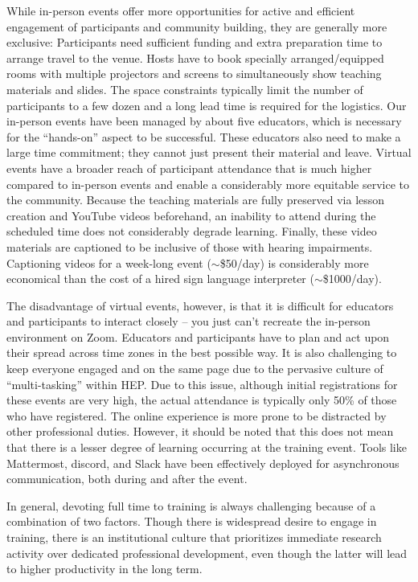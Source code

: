 \documentclass[twocolumn]{svjour3}          %
\begin{document}
While in-person events offer more opportunities for active and efficient engagement of participants and community building, they are generally more exclusive: Participants need sufficient funding and extra preparation time to arrange travel to the venue. Hosts have to book specially arranged/equipped rooms with multiple projectors and screens to simultaneously show teaching materials and slides. The space constraints typically limit the number of participants to a few dozen and a long lead time is required for the logistics.
Our in-person events have been managed by about five educators, which is necessary for the \enquote{hands-on} aspect to be successful. These educators also need to make a large time commitment; they cannot just present their material and leave.
Virtual events have a broader reach of participant attendance that is much higher compared to in-person events and enable a considerably more equitable service to the community. Because the teaching materials are fully preserved via lesson creation and YouTube videos beforehand, an inability to attend during the scheduled time does not considerably degrade learning.  Finally, these video materials are captioned to be inclusive of those with hearing impairments. Captioning videos for a week-long event ($\sim$\$50/day) is considerably more economical than the cost of a hired sign language interpreter ($\sim$\$1000/day).

The disadvantage of virtual events, however, is that it is difficult for educators and participants to interact closely -- you just can’t recreate the in-person environment on Zoom. Educators and participants have to plan and act upon their spread across time zones in the best possible way. It is also challenging to keep everyone engaged and on the same page due to the pervasive culture of \enquote{multi-tasking} within HEP. Due to this issue, although initial registrations for these events are very high, the actual attendance is typically only 50\% of those who have registered. The online experience is more prone to be distracted by other professional duties.
However, it should be noted that this does not mean that there is a lesser degree of learning occurring at the training event. Tools like Mattermost, discord, and Slack have been effectively deployed for asynchronous communication, both during and after the event.

In general, devoting full time to training is always challenging because of a combination of two factors.  Though there is widespread desire to engage in training, there is an institutional culture that prioritizes immediate research activity over dedicated professional development, even though the latter will lead to higher productivity in the long term.
%
\end{document}
